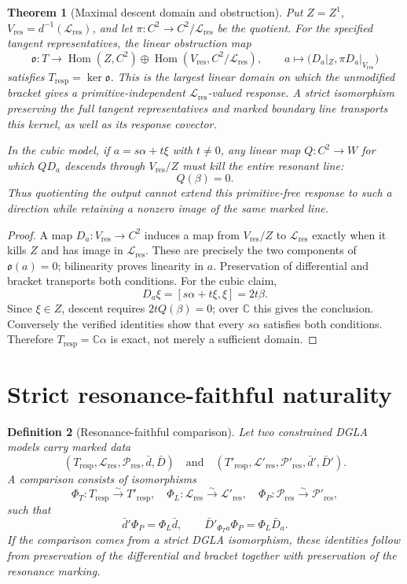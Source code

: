 \documentclass[11pt]{amsart}
\newtheorem{theorem}{Theorem}[section]
\newtheorem{definition}[theorem]{Definition}
\newcommand{\C}{\mathbb C}
\newcommand{\Hom}{\operatorname{Hom}}
\begin{document}
\begin{theorem}[Maximal descent domain and obstruction]\label{thm:response-obstruction}
Put \(Z=Z^1\), \(V_{\mathrm{res}}=d^{-1}(\mathcal L_{\mathrm{res}})\),
and let \(\pi:C^2\to C^2/\mathcal L_{\mathrm{res}}\) be the quotient.
For the specified tangent representatives, the linear obstruction map
\[
\mathfrak o:T\longrightarrow
\Hom(Z,C^2)\oplus\Hom(V_{\mathrm{res}},C^2/\mathcal L_{\mathrm{res}}),
\qquad
a\longmapsto\bigl(D_a|_Z,\pi D_a|_{V_{\mathrm{res}}}\bigr)
\]
satisfies \(T_{\mathrm{resp}}=\ker\mathfrak o\).
This is the largest linear domain on which the unmodified bracket gives a
primitive-independent \(\mathcal L_{\mathrm{res}}\)-valued response.
A strict isomorphism preserving the full tangent representatives and marked
boundary line transports this kernel, as well as its response covector.

In the cubic model, if \(a=s\alpha+t\xi\) with \(t\ne0\), any linear map
\(Q:C^2\to W\) for which \(QD_a\) descends through \(V_{\mathrm{res}}/Z\)
must kill the entire resonant line:
\[
Q(\beta)=0.
\]
Thus quotienting the output cannot extend this primitive-free response to such
a direction while retaining a nonzero image of the same marked line.
\end{theorem}
\begin{proof}
A map \(D_a:V_{\mathrm{res}}\to C^2\) induces a map from \(V_{\mathrm{res}}/Z\)
to \(\mathcal L_{\mathrm{res}}\) exactly when it kills \(Z\) and has image in
\(\mathcal L_{\mathrm{res}}\). These are precisely the two components of
\(\mathfrak o(a)=0\); bilinearity proves linearity in \(a\).
Preservation of differential and bracket transports both conditions.
For the cubic claim,
\[
D_a\xi=[s\alpha+t\xi,\xi]=2t\beta.
\]
Since \(\xi\in Z\), descent requires \(2tQ(\beta)=0\); over \(\C\) this gives
the conclusion. Conversely the verified identities show that every \(s\alpha\)
satisfies both conditions. Therefore \(T_{\mathrm{resp}}=\C\alpha\) is exact,
not merely a sufficient domain.
\end{proof}

\section{Strict resonance-faithful naturality}

\begin{definition}[Resonance-faithful comparison]
Let two constrained DGLA models carry marked data
\[
(T_{\mathrm{resp}},\mathcal L_{\mathrm{res}},\mathcal P_{\mathrm{res}},\bar d,\bar D)
\quad\text{and}\quad
(T'_{\mathrm{resp}},\mathcal L'_{\mathrm{res}},\mathcal P'_{\mathrm{res}},\bar d',\bar D').
\]
A comparison consists of isomorphisms
\[
\Phi_T:T_{\mathrm{resp}}\xrightarrow{\sim}T'_{\mathrm{resp}},
\quad
\Phi_L:\mathcal L_{\mathrm{res}}\xrightarrow{\sim}\mathcal L'_{\mathrm{res}},
\quad
\Phi_P:\mathcal P_{\mathrm{res}}\xrightarrow{\sim}\mathcal P'_{\mathrm{res}},
\]
such that
\[
\bar d'\Phi_P=\Phi_L\bar d,
\qquad
\bar D'_{\Phi_Ta}\Phi_P=\Phi_L\bar D_a.
\]
If the comparison comes from a strict DGLA isomorphism, these identities follow from preservation of the differential and bracket together with preservation of the resonance marking.
\end{definition}
\end{document}
